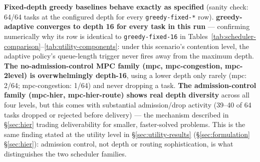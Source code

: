 \textbf{Fixed-depth greedy baselines behave exactly as specified} (sanity
check: 64/64 tasks at the configured depth for every \texttt{greedy-fixed-*}
row). \textbf{greedy-adaptive converges to depth 16 for every task in this
run} — confirming numerically why its row is identical to
\texttt{greedy-fixed-16} in Tables~\ref{tab:scheduler-comparison}--\ref{tab:utility-components}:
under this scenario's contention level, the adaptive policy's queue-length
trigger never fires away from the maximum depth. \textbf{The no-admission-control
MPC family (mpc, mpc-congestion, mpc-2level) is overwhelmingly depth-16},
using a lower depth only rarely (mpc: 2/64; mpc-congestion: 1/64) and never
dropping a task. \textbf{The admission-control family (mpc-hier,
mpc-hier-route) shows real depth diversity} across all four levels, but this
comes with substantial admission/drop activity (39--40 of 64 tasks dropped
or rejected before delivery) — the mechanism described in
\S\ref{sec:hier} trading deliverability for smaller, faster-solved problems.
This is the same finding stated at the utility level in
\S\ref{sec:utility-results} (\S\ref{sec:formulation} \S\ref{sec:hier}):
admission control, not depth or routing sophistication, is what
distinguishes the two scheduler families.

